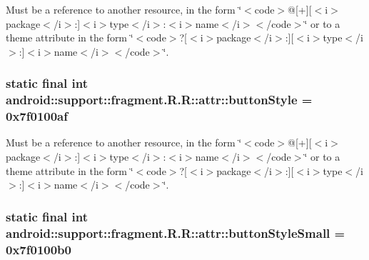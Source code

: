 Must be a reference to another resource, in the form \char`\"{}$<$code$>$@\mbox{[}+\mbox{]}\mbox{[}$<$i$>$package$<$/i$>$:\mbox{]}$<$i$>$type$<$/i$>$:$<$i$>$name$<$/i$>$$<$/code$>$\char`\"{} or to a theme attribute in the form \char`\"{}$<$code$>$?\mbox{[}$<$i$>$package$<$/i$>$:\mbox{]}\mbox{[}$<$i$>$type$<$/i$>$:\mbox{]}$<$i$>$name$<$/i$>$$<$/code$>$\char`\"{}. \hypertarget{classandroid_1_1support_1_1fragment_1_1_r_1_1attr_42fef8e7810d7262053211a16cee4b05}{
\subsubsection[{buttonStyle}]{\setlength{\rightskip}{0pt plus 5cm}static final int android::support::fragment.R.R::attr::buttonStyle = 0x7f0100af}}
\label{classandroid_1_1support_1_1fragment_1_1_r_1_1attr_42fef8e7810d7262053211a16cee4b05}


Must be a reference to another resource, in the form \char`\"{}$<$code$>$@\mbox{[}+\mbox{]}\mbox{[}$<$i$>$package$<$/i$>$:\mbox{]}$<$i$>$type$<$/i$>$:$<$i$>$name$<$/i$>$$<$/code$>$\char`\"{} or to a theme attribute in the form \char`\"{}$<$code$>$?\mbox{[}$<$i$>$package$<$/i$>$:\mbox{]}\mbox{[}$<$i$>$type$<$/i$>$:\mbox{]}$<$i$>$name$<$/i$>$$<$/code$>$\char`\"{}. \hypertarget{classandroid_1_1support_1_1fragment_1_1_r_1_1attr_c4255098b0fb268189a352c597d65e2b}{
\subsubsection[{buttonStyleSmall}]{\setlength{\rightskip}{0pt plus 5cm}static final int android::support::fragment.R.R::attr::buttonStyleSmall = 0x7f0100b0}}
\label{classandroid_1_1support_1_1fragment_1_1_r_1_1attr_c4255098b0fb268189a352c597d65e2b}


